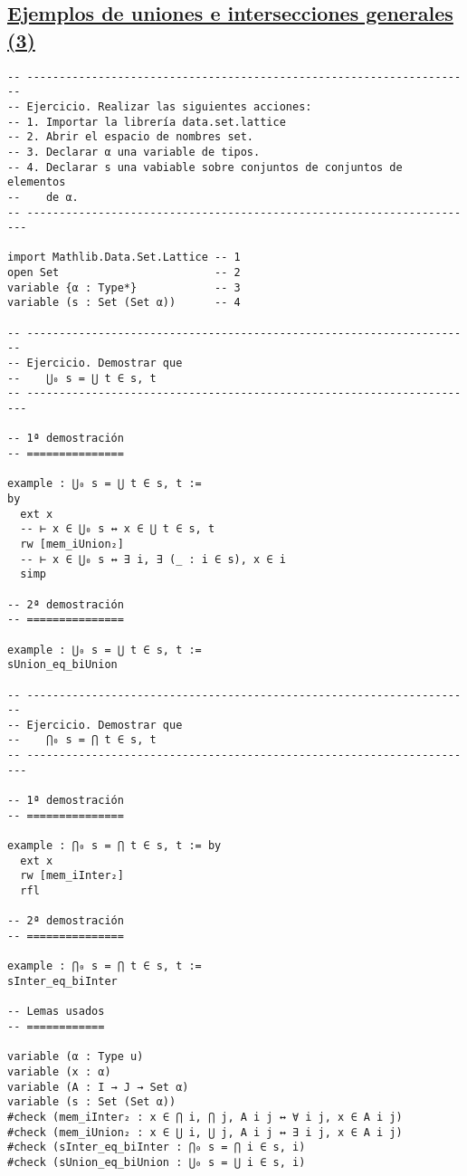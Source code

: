 \subsection{\href{./src/Conjuntos/Ejemplos\_de\_uniones\_e\_intersecciones\_generales\_3.lean}{Ejemplos de uniones e intersecciones generales (3)}}
\label{sec:org05b0136}
\begin{verbatim}
-- ---------------------------------------------------------------------
-- Ejercicio. Realizar las siguientes acciones:
-- 1. Importar la librería data.set.lattice
-- 2. Abrir el espacio de nombres set.
-- 3. Declarar α una variable de tipos.
-- 4. Declarar s una vabiable sobre conjuntos de conjuntos de elementos
--    de α.
-- ----------------------------------------------------------------------

import Mathlib.Data.Set.Lattice -- 1
open Set                        -- 2
variable {α : Type*}            -- 3
variable (s : Set (Set α))      -- 4

-- ---------------------------------------------------------------------
-- Ejercicio. Demostrar que
--    ⋃₀ s = ⋃ t ∈ s, t
-- ----------------------------------------------------------------------

-- 1ª demostración
-- ===============

example : ⋃₀ s = ⋃ t ∈ s, t :=
by
  ext x
  -- ⊢ x ∈ ⋃₀ s ↔ x ∈ ⋃ t ∈ s, t
  rw [mem_iUnion₂]
  -- ⊢ x ∈ ⋃₀ s ↔ ∃ i, ∃ (_ : i ∈ s), x ∈ i
  simp

-- 2ª demostración
-- ===============

example : ⋃₀ s = ⋃ t ∈ s, t :=
sUnion_eq_biUnion

-- ---------------------------------------------------------------------
-- Ejercicio. Demostrar que
--    ⋂₀ s = ⋂ t ∈ s, t
-- ----------------------------------------------------------------------

-- 1ª demostración
-- ===============

example : ⋂₀ s = ⋂ t ∈ s, t := by
  ext x
  rw [mem_iInter₂]
  rfl

-- 2ª demostración
-- ===============

example : ⋂₀ s = ⋂ t ∈ s, t :=
sInter_eq_biInter

-- Lemas usados
-- ============

variable (α : Type u)
variable (x : α)
variable (A : I → J → Set α)
variable (s : Set (Set α))
#check (mem_iInter₂ : x ∈ ⋂ i, ⋂ j, A i j ↔ ∀ i j, x ∈ A i j)
#check (mem_iUnion₂ : x ∈ ⋃ i, ⋃ j, A i j ↔ ∃ i j, x ∈ A i j)
#check (sInter_eq_biInter : ⋂₀ s = ⋂ i ∈ s, i)
#check (sUnion_eq_biUnion : ⋃₀ s = ⋃ i ∈ s, i)
\end{verbatim}

